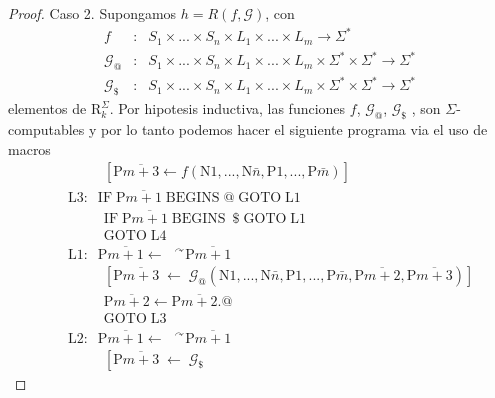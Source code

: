 \begin{theorem}
\begin{proof}
    \noindent Caso 2. Supongamos $h=R(f,\mathcal{G})$, con
    \[
      \displaystyle \begin{array}{rcl}
        f & :& S_{1}\times ...\times S_{n}\times L_{1}\times ...\times L_{m}\rightarrow \Sigma ^{\ast } \\
        \mathcal{G}_{@} & :& S_{1}\times ...\times S_{n}\times L_{1}\times ...\times L_{m}\times \Sigma ^{\ast }
          \times \Sigma ^{\ast }\rightarrow \Sigma ^{\ast } \\
        \mathcal{G}_{\$} & :& S_{1}\times ...\times S_{n}\times L_{1}\times ...\times L_{m}\times \Sigma ^{\ast }
          \times \Sigma ^{\ast }\rightarrow \Sigma ^{\ast }
      \end{array}
    \]
    elementos de $\mathrm{R}_{k}^{\Sigma }$.  Por hipotesis inductiva, las funciones $f$, $\mathcal{G}_{@}$,
    $\mathcal{G}_{\$}$ , son $\Sigma $-computables y por lo tanto podemos hacer el siguiente programa via el uso de
    macros
    \begin{eqnarray*}
      && \qquad\;\;       \left[ \mathrm{P}\overline{m+3} \leftarrow
                              f(\mathrm{N}1,...,\mathrm{N}\bar{ n},\mathrm{P}1,...,\mathrm{P}\bar{m})\right] \\
      && \mathrm{L}3:\;\; \mathrm{IF}\;\mathrm{P}\overline{m+1}\; \text{BEGINS}\;@\; \mathrm{GOTO}\;\mathrm{L}1 \\
      && \qquad\;\;       \mathrm{IF}\;\mathrm{P}\overline{m+1}\; \text{BEGINS}\;\ \$\; \mathrm{GOTO}\;\mathrm{L}1 \\
      && \qquad\;\;       \mathrm{GOTO}\; \mathrm{L}4\\
      && \mathrm{L}1:\;\; \mathrm{P}\overline{m+1} \leftarrow \text{ }^{\curvearrowright } \mathrm{P}\overline{m+1} \\
      && \qquad\;\;       \left[ \mathrm{P}\overline{m+3}\; \leftarrow\; \mathcal{G}_{@}
                                (\mathrm{N} 1,...,\mathrm{N}\bar{n},
                                \mathrm{P}1,...,\mathrm{P}\bar{m},\mathrm{P} \overline{m+2},\mathrm{P}\overline{m+3})
                          \right] \\
      && \qquad\;\;       \mathrm{P}\overline{m+2}\leftarrow \mathrm{P}\overline{m+2}.@  \\
      && \qquad\;\;       \mathrm{GOTO}\;\mathrm{L}3 \\
      && \mathrm{L}2:\;\; \mathrm{P}\overline{m+1} \leftarrow \text{ }^{\curvearrowright } \mathrm{P}\overline{m+1} \\
      && \qquad\;\;       \left[ \mathrm{P}\overline{m+3}\; \leftarrow\; \mathcal{G}_{\$}

\end{eqnarray*}
\end{proof}
\end{theorem}
